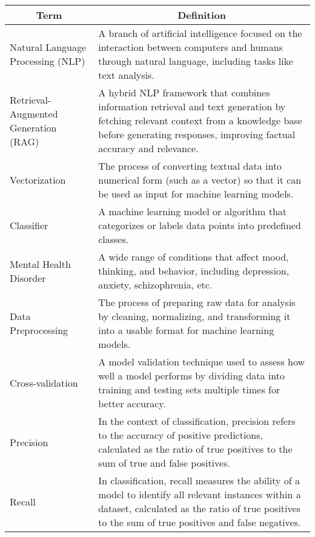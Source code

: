 \begin{center}

\begin{tabular}{|p{4cm}|p{10cm}|}
  \hline
  \multicolumn{1}{|c|}{\textbf{Term}} & \multicolumn{1}{c|}{\textbf{Definition}} \\

  \hline 
  Natural Language \newline Processing (NLP) & A branch of artificial intelligence focused on the interaction between computers and humans through natural language, including tasks like text analysis. \\

  \hline 
  Retrieval-Augmented Generation (RAG) & A hybrid NLP framework that combines information retrieval and text generation by fetching relevant context from a knowledge base before generating responses, improving factual accuracy and relevance. \\


  \hline 
  Vectorization & The process of converting textual data into numerical form (such as a vector) so that it can be used as input for machine learning models. \\

  \hline 
  Classifier & A machine learning model or algorithm that categorizes or labels data points into predefined classes. \\

  \hline
  Mental Health Disorder & A wide range of conditions that affect mood, thinking, and behavior, including depression, anxiety, schizophrenia, etc. \\

  \hline
  Data Preprocessing & The process of preparing raw data for analysis by cleaning, normalizing, and transforming it into a usable format for machine learning models. \\

  \hline 
  Cross-validation & A model validation technique used to assess how well a model performs by dividing data into training and testing sets multiple times for better accuracy. \\

  \hline
  Precision & In the context of classification, precision refers to the accuracy of positive predictions, calculated as the ratio of true positives to the sum of true and false positives. \\

  \hline
  Recall & In classification, recall measures the ability of a model to identify all relevant instances within a dataset, calculated as the ratio of true positives to the sum of true positives and false negatives. \\
  

\end{tabular}
\end{center}
